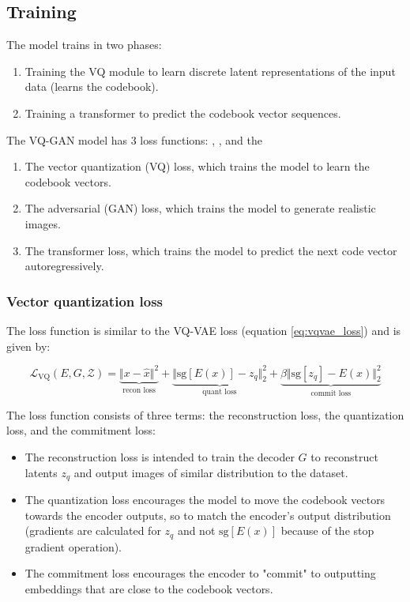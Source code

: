\subsection{Training}

The model trains in two phases:

\begin{enumerate}
    \item Training the VQ module to learn discrete latent representations of the input data (learns the codebook).
    \item Training a transformer to predict the codebook vector sequences.
\end{enumerate}

The VQ-GAN model has 3 loss functions: , , and the 

\begin{enumerate}
    \item The vector quantization (VQ) loss, which trains the model to learn the codebook vectors.
    \item The adversarial (GAN) loss, which trains the model to generate realistic images.
    \item The transformer loss, which trains the model to predict the next code vector autoregressively.
\end{enumerate}



\subsubsection*{Vector quantization loss}

The loss function is similar to the VQ-VAE loss (equation \ref{eq:vqvae_loss}) and is given by:

\begin{equation*}
    \mathcal{L}_{\text{VQ}} (E, G, \mathcal{Z}) = 
    \underbrace{\Vert x - \hat{x} \Vert ^2}_{\text{recon loss}} + 
    \underbrace{\Vert \text{sg}[E(x)] - z_q \Vert ^2_2}_{\text{quant loss}} + 
    \underbrace{\beta \Vert \text{sg}[z_q] - E(x) \Vert ^2_2}_{\text{commit loss}}
\end{equation*}

The loss function consists of three terms: the reconstruction loss, the quantization loss, and the commitment loss:

\begin{itemize}
    \item The reconstruction loss is intended to train the decoder $G$ to reconstruct latents $z_q$ and output images of similar distribution to the dataset.
    \item The quantization loss encourages the model to move the codebook vectors towards the encoder outputs, so to match the encoder's output distribution (gradients are calculated for $z_q$ and not $\text{sg}[E(x)]$ because of the stop gradient operation). 
    \item The commitment loss encourages the encoder to "commit" to outputting embeddings that are close to the codebook vectors.
\end{itemize}

